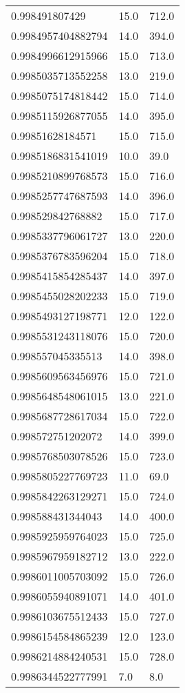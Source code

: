 \begin{center}
\begin{supertabular}[H]{p{0.30\textwidth}p{0.05\textwidth}p{0.05\textwidth}}
0.998491807429 & 15.0 & 712.0 \\ 
0.9984957404882794 & 14.0 & 394.0 \\ 
0.9984996612915966 & 15.0 & 713.0 \\ 
0.9985035713552258 & 13.0 & 219.0 \\ 
0.9985075174818442 & 15.0 & 714.0 \\ 
0.9985115926877055 & 14.0 & 395.0 \\ 
0.99851628184571 & 15.0 & 715.0 \\ 
0.9985186831541019 & 10.0 & 39.0 \\ 
0.9985210899768573 & 15.0 & 716.0 \\ 
0.9985257747687593 & 14.0 & 396.0 \\ 
0.998529842768882 & 15.0 & 717.0 \\ 
0.9985337796061727 & 13.0 & 220.0 \\ 
0.9985376783596204 & 15.0 & 718.0 \\ 
0.9985415854285437 & 14.0 & 397.0 \\ 
0.9985455028202233 & 15.0 & 719.0 \\ 
0.9985493127198771 & 12.0 & 122.0 \\ 
0.9985531243118076 & 15.0 & 720.0 \\ 
0.998557045335513 & 14.0 & 398.0 \\ 
0.9985609563456976 & 15.0 & 721.0 \\ 
0.9985648548061015 & 13.0 & 221.0 \\ 
0.9985687728617034 & 15.0 & 722.0 \\ 
0.998572751202072 & 14.0 & 399.0 \\ 
0.9985768503078526 & 15.0 & 723.0 \\ 
0.9985805227769723 & 11.0 & 69.0 \\ 
0.9985842263129271 & 15.0 & 724.0 \\ 
0.998588431344043 & 14.0 & 400.0 \\ 
0.9985925959764023 & 15.0 & 725.0 \\ 
0.9985967959182712 & 13.0 & 222.0 \\ 
0.9986011005703092 & 15.0 & 726.0 \\ 
0.9986055940891071 & 14.0 & 401.0 \\ 
0.9986103675512433 & 15.0 & 727.0 \\ 
0.9986154584865239 & 12.0 & 123.0 \\ 
0.9986214884240531 & 15.0 & 728.0 \\ 
0.9986344522777991 & 7.0 & 8.0 \\ 

\end{supertabular}
\end{center}
